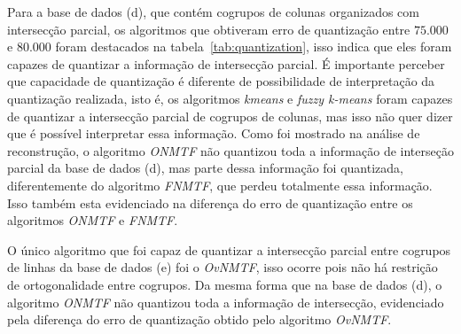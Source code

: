 \documentclass[
    12pt,                %
    oneside,            %
    a4paper,            %
    english,            %
    brazil                %
    ]{abntex2ppgsi}
\begin{document}
Para a base de dados (d), que contém cogrupos de colunas organizados com intersecção parcial, os algoritmos que obtiveram erro de quantização entre $75.000$ e $80.000$ foram destacados na tabela~\ref{tab:quantization}, isso indica que eles foram capazes de quantizar a informação de intersecção parcial.
É importante perceber que capacidade de quantização é diferente de possibilidade de interpretação da quantização realizada, isto é, os algoritmos \textit{kmeans} e \textit{fuzzy k-means} foram capazes de quantizar a intersecção parcial de cogrupos de colunas, mas isso não quer dizer que é possível interpretar essa informação.
Como foi mostrado na análise de reconstrução, o algoritmo \textit{ONMTF} não quantizou toda a informação de interseção parcial da base de dados (d), mas parte dessa informação foi quantizada, diferentemente do algoritmo \textit{FNMTF}, que perdeu totalmente essa informação.
Isso também esta evidenciado na diferença do erro de quantização entre os algoritmos \textit{ONMTF} e \textit{FNMTF}.

O único algoritmo que foi capaz de quantizar a intersecção parcial entre cogrupos de linhas da base de dados (e) foi o \textit{OvNMTF}, isso ocorre pois não há restrição de ortogonalidade entre cogrupos.
Da mesma forma que na base de dados (d), o algoritmo \textit{ONMTF} não quantizou toda a informação de intersecção, evidenciado pela diferença do erro de quantização obtido pelo algoritmo \textit{OvNMTF}.



\end{document}

